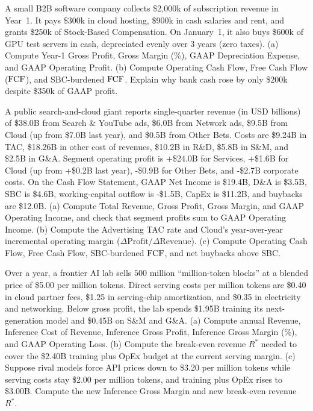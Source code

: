 \begin{exercise}
A small B2B software company collects \$2,000k of subscription revenue in Year~1. It pays \$300k in cloud hosting, \$900k in cash salaries and rent, and grants \$250k of Stock-Based Compensation. On January~1, it also buys \$600k of GPU test servers in cash, depreciated evenly over $3$ years (zero taxes).
(a) Compute Year-1 Gross Profit, Gross Margin (\%), GAAP Depreciation Expense, and GAAP Operating Profit.
(b) Compute Operating Cash Flow, Free Cash Flow ($\operatorname{FCF}$), and SBC-burdened $\operatorname{FCF}$. Explain why bank cash rose by only \$200k despite \$350k of GAAP profit.
\end{exercise}

\begin{exercise}
A public search-and-cloud giant reports single-quarter revenue (in USD billions) of \$38.0B from Search \& YouTube ads, \$6.0B from Network ads, \$9.5B from Cloud (up from \$7.0B last year), and \$0.5B from Other Bets. Costs are \$9.24B in TAC, \$18.26B in other cost of revenues, \$10.2B in R\&D, \$5.8B in S\&M, and \$2.5B in G\&A. Segment operating profit is +\$24.0B for Services, +\$1.6B for Cloud (up from +\$0.2B last year), -\$0.9B for Other Bets, and -\$2.7B corporate costs. On the Cash Flow Statement, GAAP Net Income is \$19.4B, D\&A is \$3.5B, SBC is \$4.6B, working-capital outflow is -\$1.5B, CapEx is \$11.2B, and buybacks are \$12.0B.
(a) Compute Total Revenue, Gross Profit, Gross Margin, and GAAP Operating Income, and check that segment profits sum to GAAP Operating Income.
(b) Compute the Advertising TAC rate and Cloud's year-over-year incremental operating margin ($\Delta \text{Profit} / \Delta \text{Revenue}$).
(c) Compute Operating Cash Flow, Free Cash Flow, SBC-burdened $\operatorname{FCF}$, and net buybacks above SBC.
\end{exercise}

\begin{exercise}
Over a year, a frontier AI lab sells $500$ million ``million-token blocks'' at a blended price of \$5.00 per million tokens. Direct serving costs per million tokens are \$0.40 in cloud partner fees, \$1.25 in serving-chip amortization, and \$0.35 in electricity and networking. Below gross profit, the lab spends \$1.95B training its next-generation model and \$0.45B on S\&M and G\&A.
(a) Compute annual Revenue, Inference Cost of Revenue, Inference Gross Profit, Inference Gross Margin (\%), and GAAP Operating Loss.
(b) Compute the break-even revenue $R^*$ needed to cover the \$2.40B training plus OpEx budget at the current serving margin.
(c) Suppose rival models force API prices down to \$3.20 per million tokens while serving costs stay \$2.00 per million tokens, and training plus OpEx rises to \$3.00B. Compute the new Inference Gross Margin and new break-even revenue $R^*$.
\end{exercise}

